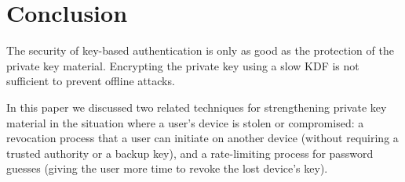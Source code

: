 \documentclass{llncs}
\begin{document}
\section{Conclusion}

The security of key-based authentication is only as good as the protection of the private key
material. Encrypting the private key using a slow KDF is not sufficient to prevent offline attacks.

In this paper we discussed two related techniques for strengthening private key material in the
situation where a user's device is stolen or compromised: a revocation process that a user can
initiate on another device (without requiring a trusted authority or a backup key), and a
rate-limiting process for password guesses (giving the user more time to revoke the lost device's
key).


{}
\end{document}
